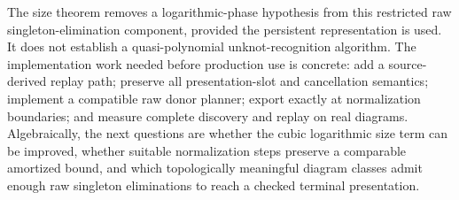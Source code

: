 The size theorem removes a logarithmic-phase hypothesis from this
restricted raw singleton-elimination component, provided the persistent
representation is used. It does not establish a quasi-polynomial
unknot-recognition algorithm. The implementation work needed before
production use is concrete: add a source-derived replay path; preserve
all presentation-slot and cancellation semantics; implement a compatible
raw donor planner; export exactly at normalization boundaries; and measure
complete discovery and replay on real diagrams. Algebraically, the next
questions are whether the cubic logarithmic size term can be improved,
whether suitable normalization steps preserve a comparable amortized
bound, and which topologically meaningful diagram classes admit enough
raw singleton eliminations to reach a checked terminal presentation.

